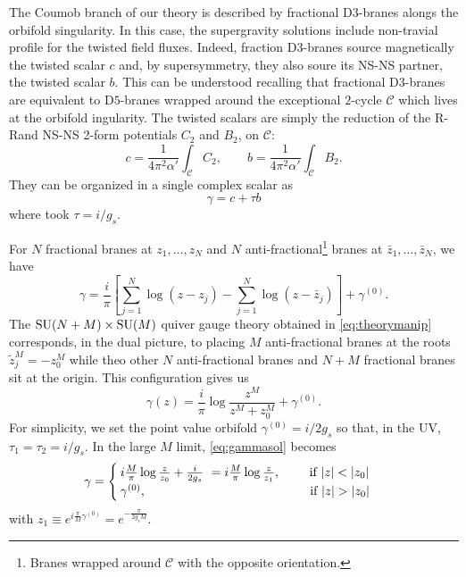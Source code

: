     The Coumob branch of our theory is described by fractional D$3$-branes alongs the orbifold singularity. In this case, the supergravity solutions include non-travial profile for the twisted field fluxes. Indeed, fraction D$3$-branes source magnetically the twisted scalar $c$ and, by supersymmetry, they also soure its NS-NS partner, the twisted scalar $b$. This can be understood recalling that fractional D$3$-branes are equivalent to D$5$-branes wrapped around the exceptional $2$-cycle $\mathcal{C}$ which lives at the orbifold ingularity. The twisted scalars are simply the reduction of the R-Rand NS-NS 2-form potentials $C_2$ and $B_2$, on $\mathcal{C}$:
    \begin{equation}
        c = \frac{1}{4\pi^2\alpha'}\int_\mathcal{C}C_2,\qquad b = \frac{1}{4\pi^2\alpha'}\int_\mathcal{C}B_2.
    \end{equation}
    They can be organized in a single complex scalar as
    \begin{equation}
        \gamma=c+\tau b
    \end{equation}
    where took $\tau=i/g_s$.

    For $N$ fractional branes at $z_1,\dots,z_N$ and $N$ anti-fractional\footnote{Branes wrapped around $\mathcal{C}$ with the opposite orientation.} branes at $\bar{z}_1,\dots,\bar{z}_N$, we have
    \begin{equation}
        \gamma=\frac{i}{\pi}\left[ \sum^N_{j=1}\log(z-z_j)-\sum^N_{j=1}\log(z-\bar{z}_j) \right]+\gamma^{(0)}.\label{eq:gammasol}
    \end{equation}
    The $\text{SU}(N+M)\times\text{SU}(M)$ quiver gauge theory obtained in \eqref{eq:theorymanip} corresponds, in the dual picture, to placing $M$ anti-fractional branes at the roots $\tilde{z}^M_j=-z^M_0$ while theo other $N$ anti-fractional branes and $N+M$ fractional branes sit at the origin. This configuration gives us
    \begin{equation}
        \gamma(z)=\frac{i}{\pi}\log\frac{z^M}{z^M+z^M_0}+\gamma^{(0)}.
    \end{equation}
    For simplicity, we set the point value orbifold $\gamma^{(0)}=i/2g_s$ so that, in the UV, $\tau_1=\tau_2=i/g_s$. In the large $M$ limit, \eqref{eq:gammasol} becomes
    \begin{equation}
        \gamma=
        \begin{cases}
            i\frac{M}{\pi}\log\frac{z}{z_0}+\frac{i}{2g_s}\ = i\frac{M}{\pi}\log\frac{z}{z_1},\qquad \text{ if } \abs{z}<\abs{z_0}\\
            \gamma^{(0)},\hspace{3.8cm}\qquad \text{ if } \abs{z}>\abs{z_0}
        \end{cases}\label{eq:flux1}
    \end{equation}
    with $z_1\equiv e^{i\frac{\pi}{M}\gamma^{(0)}}=e^{-\frac{\pi}{2g_sM}}$.

